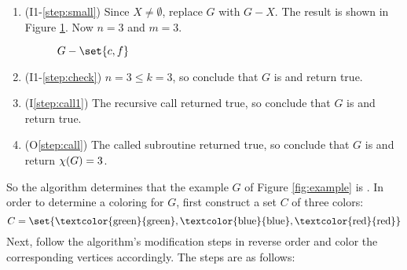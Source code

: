 \begin{enumerate}
\item (I1-\ref{step:small}) Since \(X\ne\emptyset\), replace \(G\) with \(G-X\).  The result is shown in Figure
  \ref{fig:removecf}.  Now \(n=3\) and \(m=3\).

  \begin{figure}[h]
    \label{fig:removecf}
    \begin{center}
    \end{center}
    \caption{\(G-\set{c,f}\)}
  \end{figure}

\item (I1-\ref{step:check}) \(n=3\le k=3\), so conclude that \(G\) is  and return true.

\item (I\ref{step:call1}) The recursive call returned true, so conclude that \(G\) is  and return true.

\item (O\ref{step:call}) The called subroutine returned true, so conclude that \(G\) is  and return
  \(\chi(G)=3\).

\end{enumerate}

So the algorithm determines that the example \(G\) of Figure \ref{fig:example} is .  In order to
determine a  coloring for \(G\), first construct a set \(C\) of three colors:
\[C=\set{\text{\textcolor{green}{green}},\text{\textcolor{blue}{blue}},\text{\textcolor{red}{red}}}\]
Next, follow the algorithm's modification steps in reverse order and color the corresponding vertices accordingly.
The steps are as follows:

